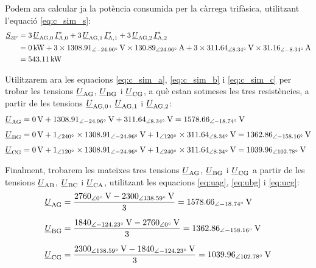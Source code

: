 \begin{exemple}
    Podem ara  calcular ja  la potència consumida per la càrrega
    trifàsica, utilitzant l'equació \eqref{eq:c_sim_s}:
    \[
    \begin{split}
    \cmplx{S}\ped{3F} &=  3\,
    \cmplx{U}\ped{AG,0}\,  \cmplx{I}\ped{A,0}^* +
    3\, \cmplx{U}\ped{AG,1}\,
    \cmplx{I}\ped{A,1}^* + 3\, \cmplx{U}\ped{AG,2}\,
    \cmplx{I}\ped{A,2}^*   \\
    &= \qty{0}{kW} + 3 \times \qtypd{1308,91}{-24,96}{V} \times
    \qtypd{130,89}{24,96}{A} + 3 \times
    \qtypd{311,64}{8,34}{V} \times \qtypd{31,16}{-8,34}{A}  \\
    &= \qty{543,11}{kW}
    \end{split}
    \]

    Utilitzarem ara les equacions \eqref{eq:c_sim_a},
    \eqref{eq:c_sim_b} i \eqref{eq:c_sim_c} per trobar les tensions $\underline{U}_\mathrm{AG}$, $\underline{U}_\mathrm{BG}$ i $\underline{U}_\mathrm{CG}$, a què
    estan sotmeses les tres resistències, a partir de les  tensions $\underline{U}_\mathrm{AG,0}$, $\underline{U}_\mathrm{AG,1}$ i $\underline{U}_\mathrm{AG,2}$:
    \begin{align*}
        \cmplx{U}\ped{AG} &= \qty{0}{V} + \qtypd{1308,91}{-24,96}{V} +
        \qtypd{311,64}{8,34}{V}  =
        \qtypd{1578,66}{-18,74}{V} \\[1ex]
        \cmplx{U}\ped{BG} &= \qty{0}{V} + \numpd{1}{240} \times
        \qtypd{1308,91}{-24,96}{V} +
        \numpd{1}{120} \times
        \qtypd{311,64}{8,34}{V}  =
        \qtypd{1362,86}{-158,16}{V}    \\[1ex]
        \cmplx{U}\ped{CG} &= \qty{0}{V} + \numpd{1}{120} \times
        \qtypd{1308,91}{-24,96}{V} +
        \numpd{1}{240} \times \qtypd{311,64}{8,34}{V}  =
        \qtypd{1039,96}{102,78}{V}
    \end{align*}

    Finalment, trobarem les mateixes tres tensions $\underline{U}_\mathrm{AG}$, $\underline{U}_\mathrm{BG}$ i $\underline{U}_\mathrm{CG}$ a partir de les tensions $\underline{U}_\mathrm{AB}$, $\underline{U}_\mathrm{BC}$ i $\underline{U}_\mathrm{CA}$, utilitzant les equacions \eqref{eq:uag}, \eqref{eq:ubg} i \eqref{eq:ucg}:
    \begin{align*}
        \cmplx{U}\ped{AG} &= \frac{\qtypd{2760}{0}{V}-\qtypd{2300}{138,59}{V}}{3}
        = \qtypd{1578,66}{-18,74}{V} \\[1.5ex]
        \cmplx{U}\ped{BG} &= \frac{\qtypd{1840}{-124,23}{V}-\qtypd{2760}{0}{V}}{3}  =
        \qtypd{1362,86}{-158,16}{V}  \\[1.5ex]
        \cmplx{U}\ped{CG} &= \frac{\qtypd{2300}{138,59}{V}-\qtypd{1840}{-124,23}{V}}{3}  = \qtypd{1039,96}{102,78}{V}
    \end{align*}
\end{exemple}


